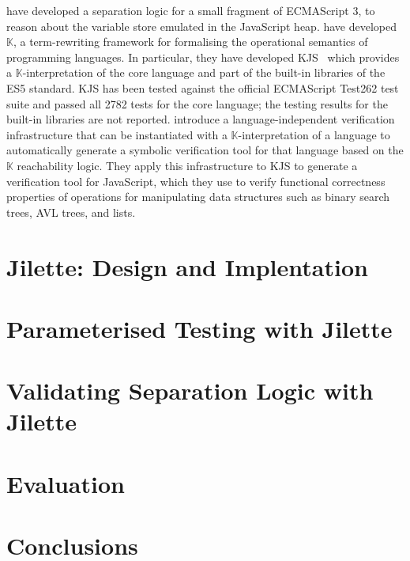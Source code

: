 \documentclass{llncs}
\newcommand{\jilette}{Jilette\xspace}
\begin{document}




%
\cite{gardner:popl:2012} have developed a separation logic for a small fragment of ECMAScript 3, to reason about the variable store emulated in the JavaScript heap.
%
\cite{rosu-serbanuta-2010-jlap} have developed $\mathbb{K}$, a term-rewriting framework  for  formalising the operational
semantics of programming languages.
 In particular, they have developed KJS~\cite{Park:2015} which provides a $\mathbb{K}$-interpretation of the core language and part of the built-in libraries of the ES5 standard. KJS has been tested against the official ECMAScript Test262 test suite and passed all 2782 tests for the core language; the testing results for the built-in libraries are not reported. 
\cite{stefanescu-park-yuwen-li-rosu-2016-oopsla} introduce a language-independent verification infrastructure 
that can be instantiated with a $\mathbb{K}$-interpretation of a  language to automatically generate a symbolic verification tool for that language based on the $\mathbb{K}$ reachability logic. They apply this infrastructure to KJS to generate a verification tool for JavaScript, which they use to verify functional correctness properties of operations for manipulating data structures such as binary search trees, AVL trees, and lists.




\section{\jilette: Design and Implentation}



\section{Parameterised Testing with \jilette}


\section{Validating Separation Logic with \jilette}


\section{Evaluation}


\section{Conclusions}\label{conclusions}

\newpage


\end{document}
